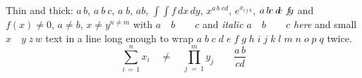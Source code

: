 \documentclass{article}
\begin{document}
Thin and thick: $a\,b$, $a\:b\>c$, $a\;b$, $a\!b$, $\int\!\!\int f\,dx\,dy$, $x^{a\,b\;c\!d}$, $e^{x_{i\,j\;k}}$,
$a\thinspace b\negthinspace c\medspace d\negmedspace e\thickspace f\negthickspace g$ and
$f(x)\ne 0$, $a\neq b$, $x \ne y^{n\neq m}$ with $a\quad b\qquad c$ and \emph{italic $a\quad b\qquad c$ here}
and {\small small $x\quad y\;z\,w$ text} in a line long enough to wrap $a\;b\;c\;d\;e\;f\;g\;h\;i\;j\;k\;l\;m\;n\;o\;p\;q$ twice.
\[ \sum_{i\,=\,1}^n x_i \quad\ne\quad \prod_{j\;=\;1}^m y_j \qquad \frac{a\,b}{c\!d} \]
\end{document}
